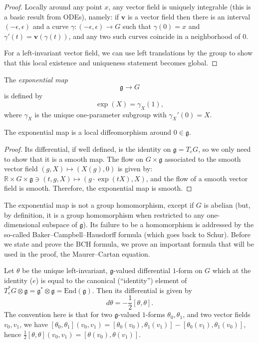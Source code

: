 \begin{proof}
 Locally around any point $x$, any vector field is uniquely integrable (this is a basic result from ODEs), namely: if $\mathbf v$ is a vector field then there is an interval $(-\epsilon,\epsilon)$ and a curve $\gamma:(-\epsilon,\epsilon)\to G$ such that $\gamma(0)=x$ and $\gamma'(t)=\mathbf v(\gamma(t))$, and any two such curves coincide in a neighborhood of $0$. 

 For a left-invariant vector field, we can use left translations by the group to show that this local existence and uniqueness statement becomes global.
\end{proof}

\begin{definition}
\label{definition-exponential-map}
The {\it exponential map}
$$\mathfrak g\to G$$
is defined by
$$\exp(X) = \gamma_X(1),$$
where $\gamma_X$ is the unique one-parameter subgroup with $\gamma_X'(0)=X$.
\end{definition}


\begin{lemma}
\label{lemma-exponential-localdiffeomorphism}
 The exponential map is a local diffeomorphism around $0\in \mathfrak g$. 
\end{lemma}

\begin{proof}
 Its differential, if well defined, is the identity on $\mathfrak g=T_eG$, so we only need to show that it is a smooth map. The flow on $G\times\mathfrak g$ associated to the smooth vector field $(g,X)\mapsto (X(g),0)$ is given by: $\mathbb R\times G\times\mathfrak g\ni (t,g,X)\mapsto (g\cdot \exp(tX), X)$, and the flow of a smooth vector field is smooth. Therefore, the exponential map is smooth.
\end{proof}


The exponential map is not a group homomorphism, except if $G$ is abelian (but, by definition, it is a group homomorphism when restricted to any one-dimensional subspace of $\mathfrak g$). Its failure to be a homomorphism is addressed by the so-called Baker--Campbell--Hausdorff formula (which goes back to Schur).
Before we state and prove the BCH formula, we prove an important formula that will be used in the proof, the Maurer--Cartan equation. 

\begin{theorem}
\label{theorem-Maurer-Cartan}
Let $\theta$ be the unique left-invariant, $\mathfrak g$-valued differential $1$-form on $G$ which at the identity ($e$) is equal to the canonical (``identity'') element of $T_e^*G\otimes \mathfrak g = \mathfrak g^* \otimes \mathfrak g = \text{End}(\mathfrak g)$.  Then its differential is given by 
\begin{equation}
\label{equation-Maurer-Cartan}
 d\theta = - \frac{1}{2} [\theta,\theta].
\end{equation}
The convention here is that for two $\mathfrak g$-valued $1$-forms $\theta_0, \theta_1$, and two vector fields $v_0, v_1$, we have $[\theta_0,\theta_1](v_0, v_1) = [\theta_0(v_0),\theta_1(v_1)] - [\theta_0(v_1),\theta_1(v_0)]$, hence $\frac{1}{2} [\theta,\theta](v_0,v_1) = [\theta(v_0),\theta(v_1)]$.
\end{theorem}


